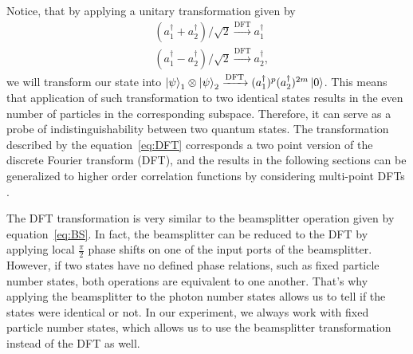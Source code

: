 Notice, that by applying a unitary transformation given by
\begin{equation}
\begin{aligned}
& (a_{1}^{\dagger} + a_{2}^{\dagger} )/\sqrt{2} \xrightarrow[]{\text{DFT}} a_{1}^{\dagger} \\
& (a_{1}^{\dagger} - a_{2}^{\dagger} )/\sqrt{2} \xrightarrow[]{\text{DFT}} a_{2}^{\dagger},
\end{aligned}
\label{eq:DFT}
\end{equation}
we will transform our state into $\left|\psi\right\rangle_1 \otimes \left|\psi\right\rangle_2 \xrightarrow[]{\text{DFT}} (a^{\dagger}_1)^p (a^{\dagger}_2)^{2m}\left|0\right\rangle$. This means that application of such transformation to two identical states results in the even number of particles in the corresponding subspace. Therefore, it can serve as a probe of indistinguishability between two quantum states. The transformation described by the equation~\ref{eq:DFT} corresponds a two point version of the discrete Fourier transform (DFT), and the results in the following sections can be generalized to higher order correlation functions by considering multi-point DFTs \cite{Daley2012}.

The DFT transformation is very similar to the beamsplitter operation given by equation~\ref{eq:BS}. In fact, the beamsplitter can be reduced to the DFT by applying local $\frac{\pi}{2}$ phase shifts on one of the input ports of the beamsplitter. However, if two states have no defined phase relations, such as fixed particle number states, both operations are equivalent to one another. That's why applying the beamsplitter to the photon number states allows us to tell if the states were identical or not. In our experiment, we always work with fixed particle number states, which allows us to use the beamsplitter transformation instead of the DFT as well. 

